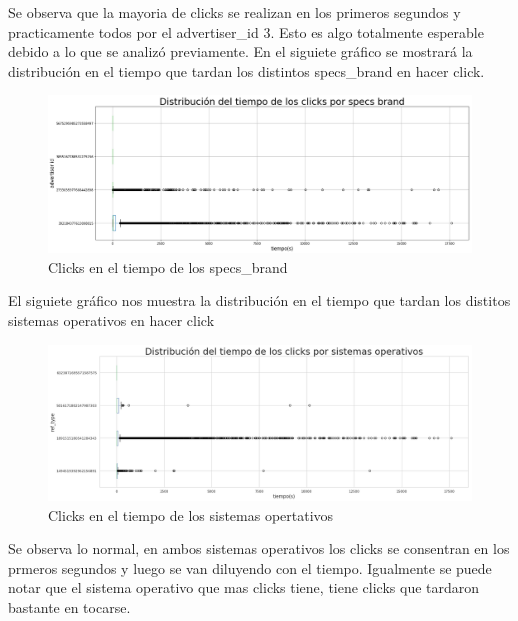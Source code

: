 \documentclass[a4paper, 12pt]{article}
\newcommand\tab[1][1cm]{\hspace*{#1}}
\begin{document}
		\tab Se observa que la mayoria de clicks se realizan en los primeros segundos y practicamente todos por el advertiser\_id 3. Esto es algo totalmente esperable debido a lo que se analizó previamente.
		\newline
		\newline
		\tab En el siguiete gráfico se mostrará la distribución en el tiempo que tardan los distintos specs\_brand en hacer click.

		\FloatBarrier
		\begin{figure}[h]
			\centering
			\includegraphics[width=\textwidth]{images/clicks/clicks_specs_brand_timeToTouch.png}
			\caption{Clicks en el tiempo de los specs\_brand}
		\end{figure}
		\FloatBarrier

		\tab El siguiete gráfico nos muestra la distribución en el tiempo que tardan los distitos sistemas operativos en hacer click

		\FloatBarrier
		\begin{figure}[h]
			\centering
			\includegraphics[width=\textwidth]{images/clicks/clicks_ref_type_timeToTouch.png}
			\caption{Clicks en el tiempo de los sistemas opertativos}
		\end{figure}
		\FloatBarrier

		\tab Se observa lo normal, en ambos sistemas operativos los clicks se consentran en los prmeros segundos y luego se van diluyendo con el tiempo. Igualmente se puede notar que el sistema operativo que mas clicks tiene, tiene clicks que tardaron bastante en tocarse.
\end{document}
